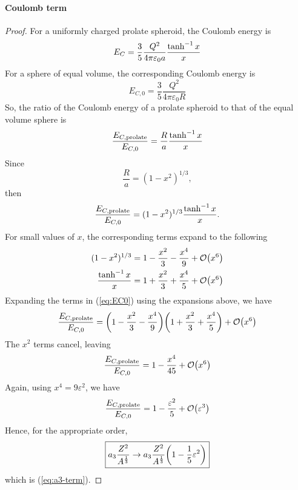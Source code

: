 \documentclass[12pt,a4paper]{article}
\begin{document}
\begin{solution_pset}
		\paragraph{Coulomb term}
		\begin{proof}
			For a uniformly charged prolate spheroid, the Coulomb energy is 
			\cite{Jadhao2015}
			\begin{equation}
				\label{eq:charged prolate spheroid}
			    E_C = 
				\frac{3}{5} 
				\frac{Q^2}{4\pi \varepsilon_0 a} 
				\frac{\tanh^{-1} x}{x} 
			\end{equation}
			For a sphere of equal volume, the corresponding Coulomb energy is
			\[
				E_{C,0} =
				\frac{3}{5} 
				\frac{Q^2}{4\pi\varepsilon_0 R} 
			\]
			So, 
			the ratio of the Coulomb energy of a prolate spheroid
			to that of the equal volume sphere is 
			\[
				\frac{
					E_{C,\text{prolate}}
				}{
					E_{C,0}
				} 
				= 
				\frac{R}{a}
				\frac{\tanh^{-1} x}{x} 
			\]
			Since
			\[
				\frac{R}{a} = (1-x^2)^{1/3},
			\]
			then
			\begin{equation}
				\label{eq:EC0}
				\frac{
					E_{C,\text{prolate}}
				}{
					E_{C,0}
				} 
				= 
				(1-x^2)^{1/3}
				\frac{\tanh^{-1} x}{x}.
			\end{equation}
			For small values of $x$, the corresponding terms expand to the following
			\begin{align*}
				(1-x^2)^{1/3} 
				&= 
				1 - \frac{x^2}{3} - \frac{x^4}{9} + \order{x^6}  \\
				\frac{\tanh\inv x}{x}
				&=
				1 + \frac{x^2}{3} + \frac{x^4}{5} + \order{x^6}
			\end{align*}
			Expanding the terms in (\ref{eq:EC0}) using the expansions above, we have
			\[
				\frac{
					E_{C,\text{prolate}}
				}{
					E_{C,0}
				} 
				=
				\pqty{
					1 - \frac{x^2}{3} - \frac{x^4}{9}
				}
				\pqty{
					1 + \frac{x^2}{3} + \frac{x^4}{5}  
				}
				+ \order{x^6}
			\]
			The $x^2$ terms cancel, leaving
			\[
				\frac{
					E_{C,\text{prolate}}
				}{
					E_{C,0}
				} 
				=
				1 - \frac{x^4}{45} + \order{x^6} 
			\]
			Again, using $x^4 = 9\varepsilon^2$, we have
			\[
				\frac{
					E_{C,\text{prolate}}
				}{
					E_{C,0}
				} 
				=
				1 - \frac{\varepsilon^2}{5} + \order{\varepsilon^3} 
			\]
			Hence, for the appropriate order,
			\begin{equation}
				\label{eq:SMEF-col-term}
				\boxed{
					a_3 \frac{Z^2}{A^\frac{1}{3}} 
					\to
					a_3 \frac{Z^2}{A^\frac{1}{3}} 
					\pqty{
						1 - \frac{1}{5}
						\varepsilon^{2}
					}
				}    
			\end{equation}
			which is (\ref{eq:a3-term}).
		\end{proof}
	\end{solution_pset}
	\newpage
\end{document}
